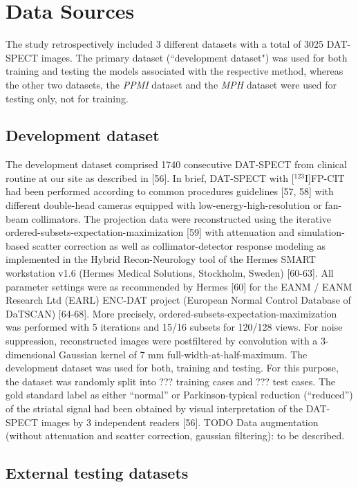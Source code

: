 \section{Data Sources}
\label{sec:data}

The study retrospectively included 3 different datasets with a total of 3025 DAT-SPECT images.
The primary dataset (``development dataset") was used for both training and testing the models associated with the respective method, 
whereas the other two datasets, the \textit{PPMI} dataset and the \textit{MPH} dataset were used for testing only, not for training.

\subsection{Development dataset}
\label{subsec:spect_dataset}

The development dataset comprised 1740 consecutive DAT-SPECT from clinical routine at our site as described in [56]. 
In brief, DAT-SPECT with [$^{123}$I]FP-CIT had been performed according to common procedures guidelines [57, 58] with different double-head cameras 
equipped with low-energy-high-resolution or fan-beam collimators. 
The projection data were reconstructed using the iterative ordered-subsets-expectation-maximization [59] with attenuation and simulation-based scatter correction 
as well as collimator-detector response modeling as implemented in the Hybrid Recon-Neurology tool of the Hermes SMART workstation v1.6 (Hermes Medical Solutions, Stockholm, Sweden) [60-63]. 
All parameter settings were as recommended by Hermes [60] for the EANM / EANM Research Ltd (EARL) ENC-DAT project (European Normal Control Database of DaTSCAN) [64-68]. 
More precisely, ordered-subsets-expectation-maximization was performed with 5 iterations and 15/16 subsets for 120/128 views. 
For noise suppression, reconstructed images were postfiltered by convolution with a 3-dimensional Gaussian kernel of 7 mm full-width-at-half-maximum. 
The development dataset was used for both, training and testing. For this purpose, the dataset was randomly split into ??? training cases and ??? test cases. 
The gold standard label as either “normal” or Parkinson-typical reduction (“reduced”) of the striatal signal had been obtained by visual interpretation of the DAT-SPECT images by 3 independent readers [56]. 
TODO Data augmentation (without attenuation and scatter correction, gaussian filtering): to be described.

\subsection{External testing datasets}
\label{subsec:external_dataset}

